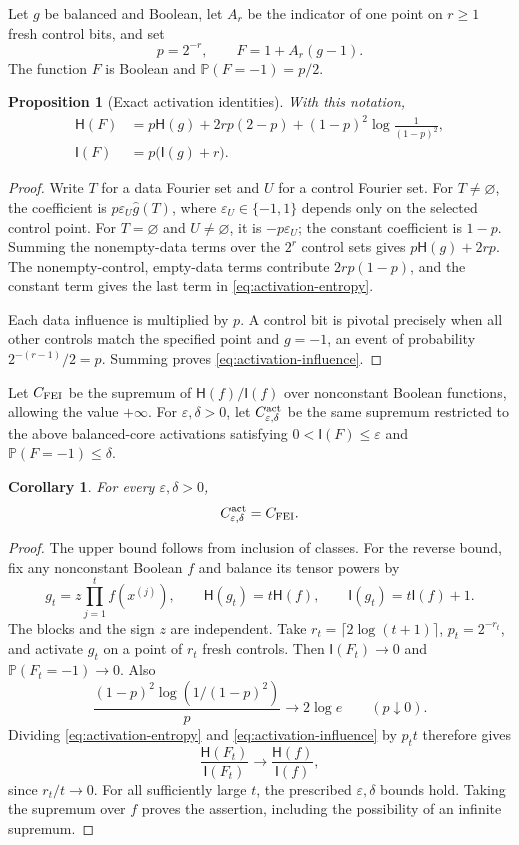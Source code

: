 \documentclass[11pt]{amsart}
\newtheorem{proposition}[theorem]{Proposition}
\newtheorem{corollary}[theorem]{Corollary}
\theoremstyle{definition}
\theoremstyle{remark}
\renewcommand{\P}{\mathbb P}
\newcommand{\HH}{\mathsf H}
\newcommand{\I}{\mathsf I}
\newcommand{\wh}[1]{\widehat{#1}}
\begin{document}
Let $g$ be balanced and Boolean, let $A_r$ be the indicator of one point
on $r\ge1$ fresh control bits, and set
\[
 p=2^{-r},\qquad F=1+A_r(g-1).
\]
The function $F$ is Boolean and $\P(F=-1)=p/2$.
\begin{proposition}[Exact activation identities]\label{prop:activation}
With this notation,
\begin{align}
 \HH(F)&=p\HH(g)+2rp(2-p)
       +(1-p)^2\log\frac1{(1-p)^2},\label{eq:activation-entropy}\\
 \I(F)&=p\bigl(\I(g)+r\bigr).\label{eq:activation-influence}
\end{align}
\end{proposition}
\begin{proof}
Write $T$ for a data Fourier set and $U$ for a control Fourier set.
For $T\ne\varnothing$, the coefficient is
$p\varepsilon_U\wh g(T)$, where $\varepsilon_U\in\{-1,1\}$ depends
only on the selected control point. For $T=\varnothing$ and
$U\ne\varnothing$, it is $-p\varepsilon_U$; the constant coefficient is
$1-p$. Summing the nonempty-data terms over the $2^r$ control sets gives
$p\HH(g)+2rp$. The nonempty-control, empty-data terms contribute
$2rp(1-p)$, and the constant term gives the last term in
\eqref{eq:activation-entropy}.

Each data influence is multiplied by $p$. A control bit is pivotal
precisely when all other controls match the specified point and $g=-1$,
an event of probability $2^{-(r-1)}/2=p$. Summing proves
\eqref{eq:activation-influence}.
\end{proof}

Let $C_{\rm FEI}$ be the supremum of $\HH(f)/\I(f)$ over nonconstant
Boolean functions, allowing the value $+\infty$.
For $\varepsilon,\delta>0$, let $C_{\varepsilon,\delta}^{\rm act}$ be
the same supremum restricted to the above balanced-core activations
satisfying $0<\I(F)\le\varepsilon$ and $\P(F=-1)\le\delta$.
\begin{corollary}\label{cor:activation-equivalence}
For every $\varepsilon,\delta>0$,
\[
 C_{\varepsilon,\delta}^{\rm act}=C_{\rm FEI}.
\]
\end{corollary}
\begin{proof}
The upper bound follows from inclusion of classes. For the reverse
bound, fix any nonconstant Boolean $f$ and balance its tensor powers by
\[
 g_t=z\prod_{j=1}^t f(x^{(j)}),
 \qquad \HH(g_t)=t\HH(f),\qquad \I(g_t)=t\I(f)+1.
\]
The blocks and the sign $z$ are independent. Take
$r_t=\lceil2\log(t+1)\rceil$, $p_t=2^{-r_t}$, and activate $g_t$ on a
point of $r_t$ fresh controls. Then $\I(F_t)\to0$ and
$\P(F_t=-1)\to0$. Also
\[
 \frac{(1-p)^2\log(1/(1-p)^2)}p\longrightarrow2\log e
 \qquad(p\downarrow0).
\]
Dividing \eqref{eq:activation-entropy} and
\eqref{eq:activation-influence} by $p_t t$ therefore gives
\[
 \frac{\HH(F_t)}{\I(F_t)}\longrightarrow
 \frac{\HH(f)}{\I(f)},
\]
since $r_t/t\to0$. For all sufficiently large $t$, the prescribed
$\varepsilon,\delta$ bounds hold. Taking the supremum over $f$ proves
the assertion, including the possibility of an infinite supremum.
\end{proof}
\end{document}
